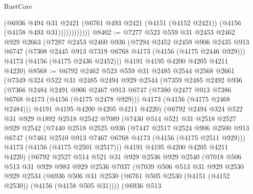 \begin{lexlean}{RustCore}
\begin{coremodule}
                    (@6936
                      @494
                      @31
                      @2421
                      (@6761 @493 @2421 (@4151 (@4152 @2421)) (@4156 (@4158 @493 @31))))))))))))
@8402 := @7277
    @523
    @559
    @31
    @2453
    @2462
    @929
    @2663
    (@7287
      @2453
      @2460
      @936
      (@7294
        @2452
        @2459
        @906
        @2435
        @913
        @6747
        (@7308 @2445 @913 @7319 @6768 @4173 (@4156 (@4175 @2446 @929)))
        @4173
        (@4156 (@4175 @2436 @2452)))
      @4191
      @4195
      @4200
      @4205
      @4211
      @4220)
@8568 := @6792
    @2462
    @523
    @559
    @31
    @2485
    @2544
    @2568
    @2661
    (@7349
      @324
      @522
      @31
      @2485
      @2494
      @929
      @2544
      (@7359
        @2485
        @2492
        @936
        (@7366
          @2484
          @2491
          @906
          @2467
          @913
          @6747
          (@7380 @2477 @913 @7386 @6768 @4173 (@4156 (@4175 @2478 @929)))
          @4173
          (@4156 (@4175 @2468 @2484)))
        @4191
        @4195
        @4200
        @4205
        @4211
        @4220)
      (@6792
        @2494
        @324
        @522
        @31
        @929
        @1892
        @2518
        @2542
        @7089
        (@7430
          @514
          @521
          @31
          @2518
          @2527
          @929
          @2542
          (@7440
            @2518
            @2525
            @936
            (@7447
              @2517
              @2524
              @906
              @2500
              @913
              @6747
              (@7461 @2510 @913 @7467 @6768 @4173 (@4156 (@4175 @2511 @929)))
              @4173
              (@4156 (@4175 @2501 @2517)))
            @4191
            @4195
            @4200
            @4205
            @4211
            @4220)
          (@6792
            @2527
            @514
            @521
            @31
            @929
            @2536
            @929
            @2540
            (@7018
              @506
              @513
              @31
              @929
              @983
              @929
              @2536
              @7037
              (@7039
                @506
                @513
                @31
                @929
                @2530
                @929
                @2534
                (@6936
                  @506
                  @31
                  @2530
                  (@6761 @505 @2530 (@4151 (@4152 @2530)) (@4156 (@4158 @505 @31))))
                (@6936
                  @513

\end{coremodule}
\end{lexlean}
